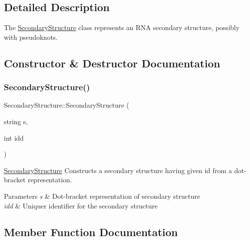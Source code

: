 \subsection{Detailed Description}
The \hyperlink{class_secondary_structure}{Secondary\+Structure} class represents an R\+NA secondary structure, possibly with pseudoknots. 

\subsection{Constructor \& Destructor Documentation}
\mbox{\label{class_secondary_structure_a97f5e5be69747e369416ccfb385e9144}} 
\subsubsection{\texorpdfstring{Secondary\+Structure()}{SecondaryStructure()}}
{\footnotesize\ttfamily Secondary\+Structure\+::\+Secondary\+Structure (\begin{DoxyParamCaption}\item[{string}]{s,  }\item[{int}]{idd }\end{DoxyParamCaption})}



\hyperlink{class_secondary_structure}{Secondary\+Structure} Constructs a secondary structure having given id from a dot-\/bracket representation. 


\begin{DoxyParams}{Parameters}
{\em s} & Dot-\/bracket representation of secondary structure \\
\hline
{\em idd} & Uniquer identifier for the secondary structure \\
\hline
\end{DoxyParams}


\subsection{Member Function Documentation}
\mbox{\label{class_secondary_structure_afc405eddcee83419865b31c76b98b80a}} 

